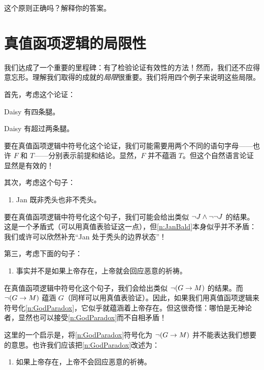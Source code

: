 这个原则正确吗？解释你的答案。

\chapter{真值函项逻辑的局限性}\label{s:ParadoxesOfMaterialConditional}

我们达成了一个重要的里程碑：有了检验论证有效性的方法！然而，我们还不应得意忘形。理解我们取得的成就的\emph{局限}很重要。我们将用四个例子来说明这些局限。

首先，考虑这个论证：


\begin{earg}
		\item Daisy 有四条腿。
		\item[\texttherefore] Daisy 有超过两条腿。
	\end{earg}


要在真值函项逻辑中符号化这个论证，我们可能需要用两个不同的语句字母——也许 $F$ 和 $T$——分别表示前提和结论。显然，$F$ 并不蕴涵 $T$。但这个自然语言论证显然是有效的！

其次，考虑这个句子：


\begin{enumerate}
		\item\label{n:JanBald} Jan 既非秃头也非不秃头。
	\end{enumerate}


要在真值函项逻辑中符号化这个句子，我们可能会给出类似 $\neg J \wedge \neg \neg J$ 的结果。这是一个矛盾式（可以用真值表验证这一点），但\cref*{n:JanBald}本身似乎并不矛盾：我们或许可以欣然补充“Jan 处于秃头的边界状态”！

第三，考虑下面的句子：


\begin{enumerate}
	\item\label{n:GodParadox} 事实并不是如果上帝存在，上帝就会回应恶意的祈祷。
\end{enumerate}


在真值函项逻辑中符号化这个句子，我们会给出类似 $\neg (G \rightarrow M)$ 的结果。而 $\neg (G \rightarrow M)$ 蕴涵 $G$（同样可以用真值表验证）。因此，如果我们用真值函项逻辑来符号化\cref*{n:GodParadox}，它似乎就蕴涵着上帝存在。但这很奇怪：哪怕是无神论者，显然也可以接受\cref*{n:GodParadox}而不自相矛盾！

这里的一个启示是，将\cref*{n:GodParadox}符号化为 $\neg(G \rightarrow M)$ 并不能表达我们想要的意思。也许我们应该把\cref*{n:GodParadox}改述为：


\begin{enumerate}
	\item\label{n:GodParadox2} 如果上帝存在，上帝不会回应恶意的祈祷。
\end{enumerate}


